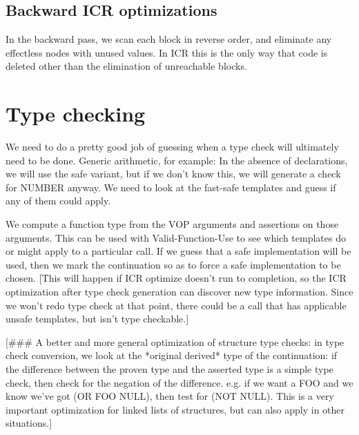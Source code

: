 \section{Backward ICR optimizations}

In the backward pass, we scan each block in reverse order, and
eliminate any effectless nodes with unused values.  In ICR this is the
only way that code is deleted other than the elimination of unreachable blocks.


\chapter{Type checking}


We need to do a pretty good job of guessing when a type check will ultimately
need to be done.  Generic arithmetic, for example: In the absence of
declarations, we will use the safe variant, but if we don't know this, we
will generate a check for NUMBER anyway.  We need to look at the fast-safe
templates and guess if any of them could apply.

We compute a function type from the VOP arguments
and assertions on those arguments.  This can be used with Valid-Function-Use
to see which templates do or might apply to a particular call.  If we guess
that a safe implementation will be used, then we mark the continuation so as to
force a safe implementation to be chosen.  [This will happen if ICR optimize
doesn't run to completion, so the ICR optimization after type check generation
can discover new type information.  Since we won't redo type check at that
point, there could be a call that has applicable unsafe templates, but isn't
type checkable.]

[\#\#\# A better and more general optimization of structure type checks: in type
check conversion, we look at the *original derived* type of the continuation:
if the difference between the proven type and the asserted type is a simple
type check, then check for the negation of the difference.  e.g. if we want a
FOO and we know we've got (OR FOO NULL), then test for (NOT NULL).  This is a
very important optimization for linked lists of structures, but can also apply
in other situations.]


